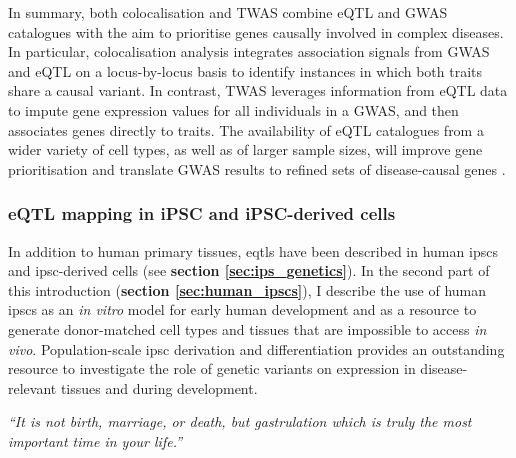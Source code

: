 In summary, both colocalisation and TWAS combine eQTL and GWAS catalogues with the aim to prioritise genes causally involved in complex diseases.
In particular, colocalisation analysis integrates association signals from GWAS and eQTL on a locus-by-locus basis to identify instances in which both traits share a causal variant. 
In contrast, TWAS leverages information from eQTL data to impute gene expression values for all individuals in a GWAS, and then associates genes directly to traits. 
The availability of eQTL catalogues from a wider variety of cell types, as well as of larger sample sizes, will improve gene prioritisation and translate GWAS results to refined sets of disease-causal genes \cite{cano2020gwas}.


\subsubsection{eQTL mapping in iPSC and iPSC-derived cells}

In addition to human primary tissues, \glspl{eqtl} have been described in human \glspl{ipsc} and \gls{ipsc}-derived cells (see \textbf{section \ref{sec:ips_genetics}}).
In the second part of this introduction (\textbf{section \ref{sec:human_ipscs}}), I describe the use of human \glspl{ipsc} as an \textit{in vitro} model for early human development and as a resource to generate donor-matched cell types and tissues that are impossible to access \textit{in vivo}.
Population-scale \gls{ipsc} derivation and differentiation provides an outstanding resource to investigate the role of genetic variants on expression in disease-relevant tissues and during development.



\newpage

\vspace*{10px}

\textit{“It is not birth, marriage, or death, but gastrulation which is truly the most important time in your life.”}\\

\vspace*{5px}


